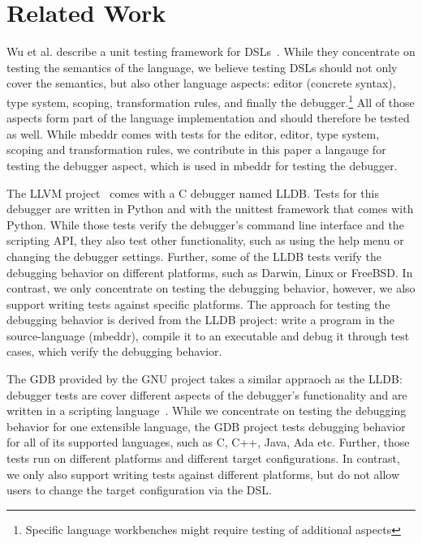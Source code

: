 \section{Related Work}

Wu et al. describe a unit testing framework for
\acp{DSL}~\cite{DBLP:conf/dsl/WuGM09}. 
While they concentrate on testing the semantics of the language, we believe testing
\acp{DSL} should not only cover the semantics, but also other language
aspects: editor (concrete syntax), type system, scoping, transformation rules,
and finally the debugger.\footnote{Specific language workbenches might require
testing of additional aspects} All of those aspects
form part of the language implementation and should therefore be tested as well.
While mbeddr comes with tests for the editor, editor, type system, scoping and
transformation rules, we contribute in this paper a langauge for testing the
debugger aspect, which is used in mbeddr for testing the debugger.

The \ac{LLVM} project~\cite{LLDB} comes with a C debugger named \ac{LLDB}.
Tests for this debugger are written in Python and with the 
unittest framework that comes with Python.
While those tests verify the debugger's command
line interface and the scripting API, they also test other functionality, such
as using the help menu or changing the debugger settings.
Further, some of the \ac{LLDB} tests  
verify the debugging behavior on different platforms, such as Darwin, Linux or
FreeBSD. In contrast, we only concentrate on testing the debugging behavior,
however, we also support writing tests against specific platforms. 
The approach for testing the debugging behavior is derived from the \ac{LLDB}
project:
write a program in the source-language (mbeddr), compile it to an executable and
debug it through test cases, which verify the debugging behavior.

The \ac{GDB} provided by the GNU project takes a similar
appraoch as the \ac{LLDB}: debugger tests are cover different aspects of the
debugger's functionality and are written in a scripting language~\cite{gdb}.
While we concentrate on testing the debugging behavior for one extensible
language, the \ac{GDB} project tests debugging behavior for all of its supported
languages, such as C, C++, Java, Ada etc. Further, those tests run on different
platforms and different target configurations. In contrast, we only also support
writing tests against different platforms, but do not allow users to change the
target configuration via the \ac{DSL}.
